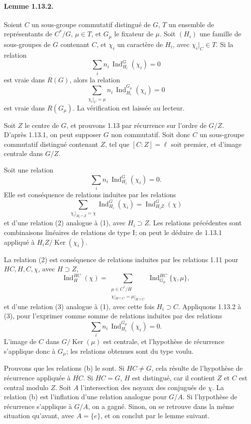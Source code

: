 \documentclass[10pt]{article}
\newcommand{\Ind}{\operatorname{Ind}}
\providecommand{\Ker}{\operatorname{Ker}}
\begin{document}
\paragraph{Lemme 1.13.2.} Soient \(C\) un sous-groupe commutatif distingué de \(G\), \(T\) un ensemble de représentants de \(C^*/G\), \(\mu\in T\), et \(G_\mu\) le fixateur de \(\mu\). Soit \((H_i)\) une famille de sous-groupes de \(G\) contenant \(C\), et \(\chi_i\) un caractère de \(H_i\), avec \(\chi_i|_C\in T\). Si la relation
\[
\sum_i n_i\,\Ind_{H_i}^G(\chi_i)=0
\]
est vraie dans \(R(G)\), alors la relation
\[
\sum_{\chi_i|_C=\mu}
n_i\,\Ind_{H_i}^{G_\mu}(\chi_i)=0
\]
est vraie dans \(R(G_\mu)\). La vérification est laissée au lecteur.

Soit \(Z\) le centre de \(G\), et prouvons 1.13 par récurrence sur l'ordre de \(G/Z\). D'après 1.13.1, on peut supposer \(G\) non commutatif. Soit donc \(C\) un sous-groupe commutatif distingué contenant \(Z\), tel que \([C:Z]=\ell\) soit premier, et d'image centrale dans \(G/Z\).

Soit une relation
\[
\tag{1}
\sum_i n_i\,\Ind_{H_i}^G(\chi_i)=0.
\]
Elle est conséquence de relations induites par les relations
\[
\sum_{\chi_i|_{H_i\cap Z}=\chi}\Ind_{H_i}^G(\chi_i)=\Ind_{H_iZ}^G(\chi)
\]
et d'une relation (2) analogue à (1), avec \(H_i\supset Z\). Les relations précédentes sont combinaisons linéaires de relations de type I; on peut le déduire de 1.13.1 appliqué à \(H_iZ/\Ker(\chi_i)\).

La relation (2) est conséquence de relations induites par les relations 1.11 pour \(HC,H,C,\chi\), avec \(H\supset Z\),
\[
\tag{b}
\Ind_H^{HC}(\chi)=
\sum_{\substack{\mu\in C^*/H\\ \chi|_{H\cap C}=\mu|_{H\cap C}}}
\Ind_{G_\mu}^{HC}\{\chi,\mu\},
\]
et d'une relation (3) analogue à (1), avec cette fois \(H_i\supset C\). Appliquons 1.13.2 à (3), pour l'exprimer comme somme de relations induites par des relations
\[
\sum_i n_i\,\Ind_{H_i}^{G_\mu}(\chi_i)=0.
\]
L'image de \(C\) dans \(G/\Ker(\mu)\) est centrale, et l'hypothèse de récurrence s'applique donc à \(G_\mu\); les relations obtenues sont du type voulu.

Prouvons que les relations (b) le sont. Si \(HC\ne G\), cela résulte de l'hypothèse de récurrence appliquée à \(HC\). Si \(HC=G\), \(H\) est distingué, car il contient \(Z\) et \(C\) est central modulo \(Z\). Soit \(A\) l'intersection des noyaux des conjugués de \(\chi\). La relation (b) est l'inflation d'une relation analogue pour \(G/A\). Si l'hypothèse de récurrence s'applique à \(G/A\), on a gagné. Sinon, on se retrouve dans la même situation qu'avant, avec \(A=\{e\}\), et on conclut par le lemme suivant.
\end{document}
